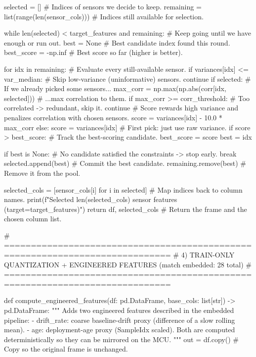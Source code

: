     selected = []                          # Indices of sensors we decide to keep.
    remaining = list(range(len(sensor_cols)))  # Indices still available for selection.

    while len(selected) < target_features and remaining:  # Keep going until we have enough or run out.
        best = None                        # Best candidate index found this round.
        best_score = -np.inf               # Best score so far (higher is better).

        for idx in remaining:              # Evaluate every still-available sensor.
            if variances[idx] <= var_median:  # Skip low-variance (uninformative) sensors.
                continue
            if selected:                   # If we already picked some sensors...
                max_corr = np.max(np.abs(corr[idx, selected]))  # ...max correlation to them.
                if max_corr >= corr_threshold:  # Too correlated -> redundant, skip it.
                    continue
                # Score rewards high variance and penalizes correlation with chosen sensors.
                score = variances[idx] - 10.0 * max_corr
            else:
                score = variances[idx]     # First pick: just use raw variance.
            if score > best_score:         # Track the best-scoring candidate.
                best_score = score
                best = idx

        if best is None:                   # No candidate satisfied the constraints -> stop early.
            break
        selected.append(best)              # Commit the best candidate.
        remaining.remove(best)             # Remove it from the pool.

    selected_cols = [sensor_cols[i] for i in selected]     # Map indices back to column names.
    print(f"Selected {len(selected_cols)} sensor features (target={target_features})")
    return df, selected_cols               # Return the frame and the chosen column list.

# =============================================================================
# 4) TRAIN-ONLY QUANTIZATION + ENGINEERED FEATURES (match embedded: 28 total)
# =============================================================================

def compute_engineered_features(df: pd.DataFrame, base_cols: list[str]) -> pd.DataFrame:
    """
    Adds two engineered features described in the embedded pipeline:
    - drift_rate: coarse baseline-drift proxy (difference of a slow rolling mean).
    - age: deployment-age proxy (SampleIdx scaled).
    Both are computed deterministically so they can be mirrored on the MCU.
    """
    out = df.copy()                        # Copy so the original frame is unchanged.

